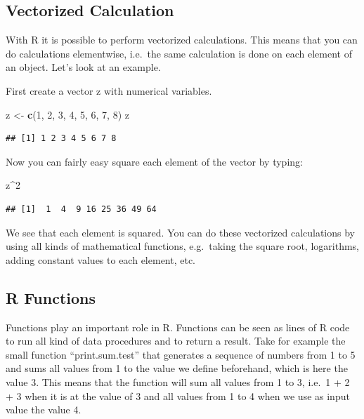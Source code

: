 \documentclass[]{book}
\newenvironment{Shaded}{\begin{snugshade}}{\end{snugshade}}
\newcommand{\KeywordTok}[1]{\textcolor[rgb]{0.13,0.29,0.53}{\textbf{#1}}}
\newcommand{\DecValTok}[1]{\textcolor[rgb]{0.00,0.00,0.81}{#1}}
\newcommand{\StringTok}[1]{\textcolor[rgb]{0.31,0.60,0.02}{#1}}
\newcommand{\OperatorTok}[1]{\textcolor[rgb]{0.81,0.36,0.00}{\textbf{#1}}}
\newcommand{\NormalTok}[1]{#1}
\begin{document}
\subsection{Vectorized Calculation}\label{vectorized-calculation}

With R it is possible to perform vectorized calculations. This means
that you can do calculations elementwise, i.e.~the same calculation is
done on each element of an object. Let's look at an example.

First create a vector z with numerical variables.

\begin{Shaded}
\begin{Highlighting}[]
\NormalTok{z <-}\StringTok{ }\KeywordTok{c}\NormalTok{(}\DecValTok{1}\NormalTok{, }\DecValTok{2}\NormalTok{, }\DecValTok{3}\NormalTok{, }\DecValTok{4}\NormalTok{, }\DecValTok{5}\NormalTok{, }\DecValTok{6}\NormalTok{, }\DecValTok{7}\NormalTok{, }\DecValTok{8}\NormalTok{)}
\NormalTok{z}
\end{Highlighting}
\end{Shaded}

\begin{verbatim}
## [1] 1 2 3 4 5 6 7 8
\end{verbatim}

Now you can fairly easy square each element of the vector by typing:

\begin{Shaded}
\begin{Highlighting}[]
\NormalTok{z}\OperatorTok{^}\DecValTok{2}
\end{Highlighting}
\end{Shaded}

\begin{verbatim}
## [1]  1  4  9 16 25 36 49 64
\end{verbatim}

We see that each element is squared. You can do these vectorized
calculations by using all kinds of mathematical functions, e.g.~taking
the square root, logarithms, adding constant values to each element,
etc.

\subsection{R Functions}\label{r-functions}

Functions play an important role in R. Functions can be seen as lines of
R code to run all kind of data procedures and to return a result. Take
for example the small function ``print.sum.test'' that generates a
sequence of numbers from 1 to 5 and sums all values from 1 to the value
we define beforehand, which is here the value 3. This means that the
function will sum all values from 1 to 3, i.e.~1 + 2 + 3 when it is at
the value of 3 and all values from 1 to 4 when we use as input value the
value 4.
\end{document}
